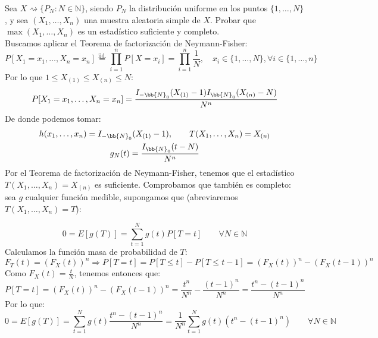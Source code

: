 \begin{ejercicio} %
    Sea $X\rightsquigarrow\{P_N : N\in \mathbb{N}\}$, siendo $P_N$ la distribución uniforme en los puntos $\{1,\ldots,N\}$, y sea $(X_1, \ldots, X_n)$ una muestra aleatoria simple de $X$. Probar que $\max(X_1, \ldots, X_n)$ es un estadístico suficiente y completo.\\

    \noindent
    Buscamos aplicar el Teorema de factorización de Neymann-Fisher:
    \begin{equation*}
        P[X_1 = x_1, \ldots, X_n = x_n] \stackrel{\text{iid.}}{=} \prod_{i=1}^{n}P[X=x_i] =  \prod_{i=1}^{n} \dfrac{1}{N}, \quad x_i \in \{1,\ldots, N\}, \forall i \in \{1,\ldots,n\}
    \end{equation*}
    Por lo que $1\leq X_{(1)} \leq X_{(n)} \leq N$:
    \begin{equation*}
        P[X_1 = x_1, \ldots, X_n=x_n] = \dfrac{I_{-\bb{N}_0}(X_{(1)}-1)I_{\bb{N}_0}(X_{(n)}-N)}{N^n}
    \end{equation*}
    De donde podemos tomar:
    \begin{gather*}
        h(x_1, \ldots, x_n) = I_{-\bb{N}_0}(X_{(1)}-1), \qquad T(X_1, \ldots, X_n) = X_{(n)} \\ 
        g_N(t) = \dfrac{I_{\bb{N}_0}(t-N)}{N^n}
    \end{gather*}
    Por el Teorema de factorización de Neymann-Fisher, tenemos que el estadístico $T(X_1, \ldots, X_n) = X_{(n)}$ es suficiente. Comprobamos que también es completo: sea $g$ cualquier función medible, supongamos que (abreviaremos $T(X_1, \ldots, X_n) = T$):

    \begin{equation*}
        0 = E[g(T)] = \sum_{t=1}^{N}g(t)P[T=t] \qquad \forall N\in \mathbb{N}
    \end{equation*}
    Calculamos la función masa de probabilidad de $T$:
    \begin{equation*}
        F_T(t) = {(F_X(t))}^{n} \Longrightarrow P[T=t] = P[T\leq t] - P[T\leq t-1] = {(F_X(t))}^{n} - {(F_X(t-1))}^{n}
    \end{equation*}
    Como $F_X(t) = \frac{t}{N}$, tenemos entonces que:
    \begin{equation*}
        P[T=t] = {(F_X(t))}^{n} - {(F_X(t-1))}^{n} = \dfrac{t^n}{N^n} - \dfrac{{(t-1)}^{n}}{N^n} = \dfrac{t^n - {(t-1)}^{n}}{N^n}
    \end{equation*}
    Por lo que:
    \begin{equation*}
        0 = E[g(T)] = \sum_{t=1}^{N} g(t) \dfrac{t^n -{(t-1)}^{n}}{N^n} = \dfrac{1}{N^n} \sum_{t=1}^{N} g(t) (t^n - {(t-1)}^{n}) \qquad \forall N\in \mathbb{N}
    \end{equation*}
\end{ejercicio}

